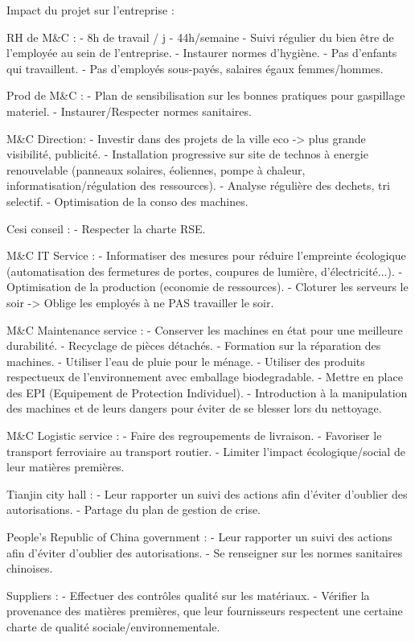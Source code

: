 Impact du projet sur l'entreprise : 

RH de M\&C :
- 8h de travail / j - 44h/semaine
- Suivi régulier du bien être de l'employée au sein de l'entreprise.
- Instaurer normes d'hygiène.
- Pas d'enfants qui travaillent.
- Pas d'employés sous-payés, salaires égaux femmes/hommes. 

Prod de M\&C :
- Plan de sensibilisation sur les bonnes pratiques pour gaspillage materiel.
- Instaurer/Respecter normes sanitaires.

M\&C Direction:
- Investir dans des projets de la ville eco -> plus grande visibilité, publicité.
- Installation progressive sur site de technos à energie renouvelable (panneaux solaires, éoliennes, pompe à chaleur, informatisation/régulation des ressources).
- Analyse régulière des dechets, tri selectif.
- Optimisation de la conso des machines.

Cesi conseil :
- Respecter la charte RSE.

M\&C IT Service :
- Informatiser des mesures pour réduire l'empreinte écologique (automatisation des fermetures de portes, coupures de lumière, d'électricité...).
- Optimisation de la production (economie de ressources).
- Cloturer les serveurs le soir -> Oblige les employés à ne PAS travailler le soir.

M\&C Maintenance service :
- Conserver les machines en état pour une meilleure durabilité.
- Recyclage de pièces détachés.
- Formation sur la réparation des machines.
- Utiliser l'eau de pluie pour le ménage.
- Utiliser des produits respectueux de l'environnement avec emballage biodegradable.
- Mettre en place des EPI (Equipement de Protection Individuel).
- Introduction à la manipulation des machines et de leurs dangers pour éviter de se blesser lors du nettoyage.

M\&C Logistic service :
- Faire des regroupements de livraison.
- Favoriser le transport ferroviaire au transport routier.
- Limiter l'impact écologique/social de leur matières premières. 

Tianjin city hall :
- Leur rapporter un suivi des actions afin d'éviter d'oublier des autorisations.
- Partage du plan de gestion de crise.

People's Republic of China government :
- Leur rapporter un suivi des actions afin d'éviter d'oublier des autorisations.
- Se renseigner sur les normes sanitaires chinoises.

Suppliers : 
- Effectuer des contrôles qualité sur les matériaux.
- Vérifier la provenance des matières premières, que leur fournisseurs respectent une certaine charte de qualité sociale/environnementale.

